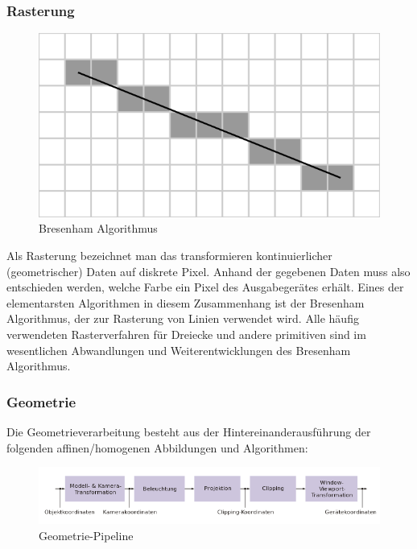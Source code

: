 \subsubsection{Rasterung}
\begin{figure}[H]
    \centering
    \includegraphics[width=1.0\textwidth]{images/bresenham.png}
    \caption{Bresenham Algorithmus}
    \label{fig:gimbal+lock}
\end{figure}
Als Rasterung bezeichnet man das transformieren kontinuierlicher (geometrischer) Daten auf diskrete Pixel.
Anhand der gegebenen Daten muss also entschieden werden, welche Farbe ein Pixel des Ausgabegerätes erhält.
Eines der elementarsten Algorithmen in diesem Zusammenhang ist der Bresenham Algorithmus, der zur Rasterung von Linien verwendet wird. Alle häufig verwendeten Rasterverfahren für Dreiecke und andere primitiven sind im wesentlichen Abwandlungen und Weiterentwicklungen  des Bresenham Algorithmus.

\subsubsection{Geometrie}
Die Geometrieverarbeitung   besteht aus der Hintereinanderausführung der folgenden affinen/homogenen Abbildungen und Algorithmen:
\begin{figure}[H]
    \centering
    \includegraphics[width=1.0\textwidth]{images/cgpipeline.png}
    \caption{Geometrie-Pipeline}
    \label{fig:gimbal+lock}
\end{figure}

